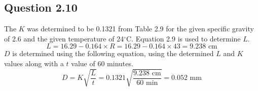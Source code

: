 \documentclass{article}
\begin{document}
\subsection*{Question 2.10}
The \(K\) was determined to be 0.1321 from Table 2.9 for the given specific gravity of 2.6 and the given temperature of 24$^{\circ}$C. Equation 2.9 is used to determine $L$.
\[L=16.29-0.164\times R=16.29-0.164\times 43=9.238\text{ cm}\] 
\(D\) is determined using the following equation, using the determined $L$ and $K$ values along with a $t$ value of 60 minutes.
\[D=K\sqrt{\frac{L}{t}}=0.1321\sqrt{\frac{9.238\text{ cm}}{60\text{ min}}}=\boxed{0.052\text{ mm}}\]
\end{document}
